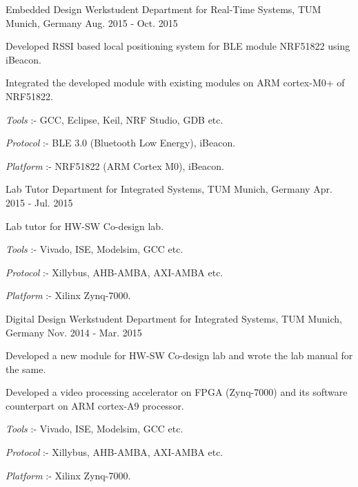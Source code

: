 \begin{cventries}
  \cventry
    {Embedded Design Werkstudent} %
    {Department for Real-Time Systems, TUM} %
    {Munich, Germany} %
    {Aug. 2015 - Oct. 2015} %
    {
      \begin{cvitems} %
        \item {Developed RSSI based local positioning system for BLE module NRF51822 using iBeacon.}
        \item {Integrated the developed module with existing modules on ARM cortex-M0+ of NRF51822.}
        \item {\textit{Tools} :- GCC, Eclipse, Keil, NRF Studio, GDB etc.}
        \item {\textit{Protocol} :- BLE 3.0 (Bluetooth Low Energy), iBeacon.}
        \item {\textit{Platform} :- NRF51822 (ARM Cortex M0), iBeacon.}
      \end{cvitems}
    }

  \cventry
    {Lab Tutor} %
    {Department for Integrated Systems, TUM} %
    {Munich, Germany} %
    {Apr. 2015 - Jul. 2015} %
    {
      \begin{cvitems} %
        \item {Lab tutor for HW-SW Co-design lab.}
        \item {\textit{Tools} :- Vivado, ISE, Modelsim, GCC etc.}
        \item {\textit{Protocol} :- Xillybus, AHB-AMBA, AXI-AMBA etc.}
        \item {\textit{Platform} :- Xilinx Zynq-7000.}
      \end{cvitems}
    }
    
  \cventry
    {Digital Design Werkstudent} %
    {Department for Integrated Systems, TUM} %
    {Munich, Germany} %
    {Nov. 2014 - Mar. 2015} %
    {
      \begin{cvitems} %
        \item {Developed a new module for HW-SW Co-design lab and wrote the lab manual for the same.}
        \item {Developed a video processing accelerator on FPGA (Zynq-7000) and its software counterpart on ARM cortex-A9 processor.}
        \item {\textit{Tools} :- Vivado, ISE, Modelsim, GCC etc.}
        \item {\textit{Protocol} :- Xillybus, AHB-AMBA, AXI-AMBA etc.}
        \item {\textit{Platform} :- Xilinx Zynq-7000.}
      \end{cvitems}
    }


\end{cventries}
